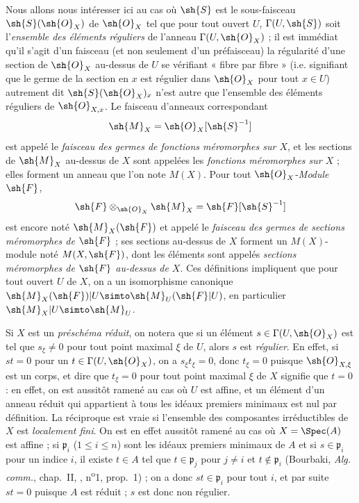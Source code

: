 \begin{env}[20.1.3]
Nous allons nous intéresser ici au cas où $\sh{S}$ est le sous-faisceau $\sh{S}(\sh{O}_X)$ de $\sh{O}_X$ tel que pour tout ouvert $U$, $\Gamma(U,\sh{S})$ soit l'\emph{ensemble des éléments réguliers} de l'anneau $\Gamma(U,\sh{O}_X)$ ; il est immédiat qu'il s'agit d'un faisceau (et non seulement d'un préfaisceau) la régularité d'une section de $\sh{O}_X$ au-dessus de $U$ se vérifiant « fibre par fibre » (i.e. signifiant que le germe de la section en $x$ est régulier dans $\sh{O}_X$ pour tout $x\in U$) autrement dit $\sh{S}(\sh{O}_X)_x$ n'est autre que l'ensemble des éléments réguliers de $\sh{O}_{X,x}$.
Le faisceau d'anneaux correspondant
\[
  \sh{M}_X=\sh{O}_X[\sh{S}^{-1}]
\]
est appelé le \emph{faisceau des germes de fonctions méromorphes sur $X$}, et les sections de $\sh{M}_X$ au-dessus de $X$ sont appelées les \emph{fonctions méromorphes sur $X$} ; elles forment un anneau que l'on note $M(X)$.
Pour tout $\sh{O}_X$-\emph{Module} $\sh{F}$,
\[
  \sh{F}\otimes_{\sh{O}_X}\sh{M}_X=\sh{F}[\sh{S}^{-1}]
\]
est encore noté $\sh{M}_X(\sh{F})$ et appelé le \emph{faisceau des germes de sections méromorphes de $\sh{F}$} ; ses sections au-dessus de $X$ forment un $M(X)$-module noté $M(X,\sh{F})$, dont les éléments sont appelés \emph{sections méromorphes de $\sh{F}$ au-dessus de $X$}.
Ces définitions impliquent que pour tout ouvert $U$ de $X$, on a un isomorphisme canonique $\sh{M}_X(\sh{F})|U\simto\sh{M}_U(\sh{F}|U)$, en particulier $\sh{M}_X|U\simto\sh{M}_U$.
\end{env}

\begin{env}[20.1.3.1]
\label{IV.20.1.3.1}
Si $X$ est un \emph{préschéma réduit}, on notera que si un élément $s\in\Gamma(U,\sh{O}_X)$ est tel que $s_\xi\neq0$ pour tout point maximal $\xi$ de $U$, alors $s$ est \emph{régulier}.
En effet, si $st=0$ pour un $t\in\Gamma(U,\sh{O}_X)$, on a $s_\xi t_\xi=0$, donc $t_\xi=0$ puisque $\sh{O}_{X,\xi}$ est un corps, et dire que $t_\xi=0$ pour tout point maximal $\xi$ de $X$ signifie que $t=0$ : en effet, on est aussitôt ramené au cas où $U$ est affine, et un élément d'un anneau réduit qui appartient à tous les idéaux premiers minimaux est nul par définition.
La réciproque est vraie si l'ensemble des composantes irréductibles de $X$ est \emph{localement fini}.
On est en effet aussitôt ramené au cas où $X=\Spec(A)$ est affine ; si $\mathfrak p_i$ ($1\leq i\leq n$) sont les idéaux premiers minimaux de $A$ et si $s\in\mathfrak p_i$ pour un indice $i$, il existe $t\in A$ tel que $t\in\mathfrak p_j$ pour $j\neq i$ et $t\notin\mathfrak p_i$ (Bourbaki, \emph{Alg. comm.}, chap.~II, , n\textsuperscript{o}1, prop.~1) ; on a donc $st\in\mathfrak p_i$ pour tout $i$, et par suite $st=0$ puisque $A$ est réduit ; $s$ est donc non régulier.
\end{env}


